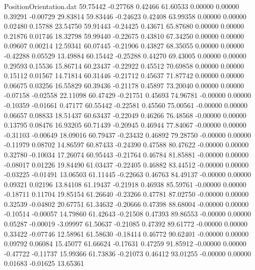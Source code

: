 \begin{filecontents}{PositionOrientation.dat}
  59.75442   -0.27768    0.42466    61.60533    0.00000    0.00000    0.39291   -0.00729   29.83814
  59.83446   -0.24623    0.42408    63.99358    0.00000    0.00000    0.02480    0.15788   23.54750
  59.91443   -0.24425    0.43671    65.87680    0.00000    0.00000    0.21876    0.01746   18.32798
  59.99440   -0.22675    0.43810    67.34250    0.00000    0.00000    0.09607    0.00214   12.59341
  60.07445   -0.21906    0.43827    68.35055    0.00000    0.00000   -0.42288    0.05529   13.49884
  60.15442   -0.25288    0.44270    69.43005    0.00000    0.00000    0.29593    0.15536   15.86714
  60.23437   -0.22922    0.45512    70.69858    0.00000    0.00000    0.15112    0.01567   14.71814
  60.31446   -0.21712    0.45637    71.87742    0.00000    0.00000    0.06675    0.03256   16.55829
  60.39436   -0.21178    0.45897    73.20040    0.00000    0.00000   -0.07158   -0.02558   22.11098
  60.47429   -0.21751    0.45693    74.96781   -0.00000    0.00000   -0.10359   -0.01661    0.47177
  60.55442   -0.22581    0.45560    75.00561   -0.00000    0.00000    0.06657    0.08833   18.51437
  60.63437   -0.22049    0.46266    76.48568   -0.00000    0.00000    0.13795    0.08476   16.93205
  60.71439   -0.20945    0.46944    77.84067   -0.00000    0.00000   -0.31103   -0.00649   18.09016
  60.79437   -0.23432    0.46892    79.28750   -0.00000    0.00000   -0.11979    0.08702   14.86597
  60.87433   -0.24390    0.47588    80.47622   -0.00000    0.00000    0.32780   -0.10034   17.26074
  60.95443   -0.21764    0.46784    81.85881   -0.00000    0.00000   -0.08017    0.01226   19.84490
  61.03437   -0.22405    0.46882    83.44512   -0.00000    0.00000   -0.03225   -0.01491   13.06503
  61.11445   -0.22663    0.46763    84.49137   -0.00000    0.00000    0.09321    0.02196   13.84108
  61.19437   -0.21918    0.46938    85.59761   -0.00000    0.00000   -0.18711    0.11704   19.85154
  61.26640   -0.23266    0.47781    87.02750   -0.00000    0.00000    0.32539   -0.04802   20.67751
  61.34632   -0.20666    0.47398    88.68004   -0.00000    0.00000   -0.10514   -0.00057   14.79860
  61.42643   -0.21508    0.47393    89.86553   -0.00000    0.00000    0.05287   -0.00019   -3.09997
  61.50637   -0.21085    0.47392    89.61772   -0.00000    0.00000    0.33422   -0.07746   12.58961
  61.58630   -0.18414    0.46772    90.62401   -0.00000    0.00000    0.09792    0.06084   15.45077
  61.66624   -0.17631    0.47259    91.85912   -0.00000    0.00000   -0.47722   -0.11737   15.99366
  61.73836   -0.21073    0.46412    93.01255   -0.00000    0.00000    0.01683   -0.01625   13.65361

\end{filecontents}
